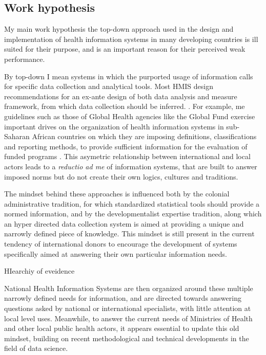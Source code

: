 \subsection{Work hypothesis}

My main work hypothesis the top-down approach used in the design and implementation of health information systems in many developing countries is ill suited for their purpose, and is an important reason for their perceived weak performance.

By top-down I mean systems in which the purported usage of information calls for specific data collection and analytical tools. Most HMIS design recommendations for an ex-ante design of both data analysis and measure framework, from which data collection should be inferred. \citep{lippeveld_routine_2000,rhino_introducing_2003,daltilia_systeme_2005,health_metrics_network_framework_2008}. For example, \gls{me} guidelines such as those of Global Health agencies like the Global Fund exercise important drives on the organization of health information systems in sub-Saharan African countries on which they are imposing definitions, classifications and reporting methods, to provide sufficient information for the evaluation of funded programs \citep{the_global_fund_global_2014}. This asymetric relationship between international and local actors leads to a    \textit{reductio ad \gls{me}} of information systems, that are built to answer imposed norms but do not create their own logics, cultures and traditions.

The mindset behind these approaches is influenced both by the colonial administrative tradition, for which standardized statistical tools should provide a normed information, and by the developmentalist expertise tradition, along which an hyper directed data collection system is aimed at providing a unique and narrowly defined piece of knowledge. This mindset is still present in the current tendency of international donors to encourage the development of systems specifically aimed at answering their own particular information needs.


HIearchiy of eveidence

National Health Information Systems are then organized around these multiple narrowly defined needs for information, and are directed towards answering questions asked by national or international specialists, with little attention at local level uses. Meanwhile, to answer the current needs of Ministries of Health and other local public health actors, it appears essential to update this old mindset, building on recent methodological and technical developments in the field of data science.


